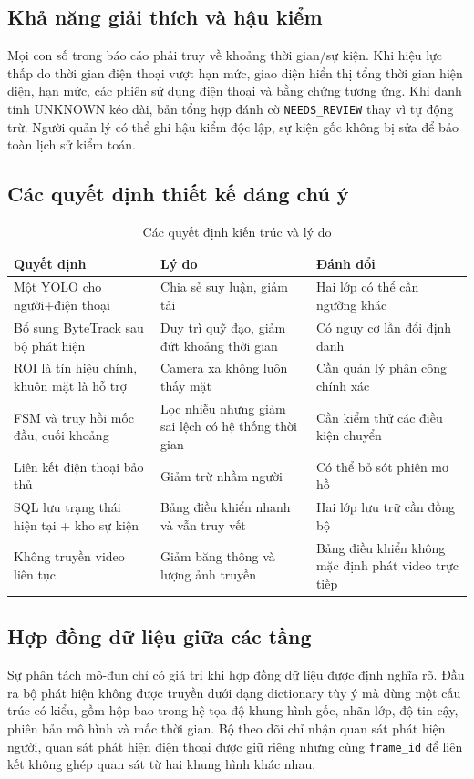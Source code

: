 \subsection{Khả năng giải thích và hậu kiểm}
Mọi con số trong báo cáo phải truy về khoảng thời gian/sự kiện. Khi hiệu lực thấp do thời gian điện thoại vượt hạn mức, giao diện hiển thị tổng thời gian hiện diện, hạn mức, các phiên sử dụng điện thoại và bằng chứng tương ứng. Khi danh tính UNKNOWN kéo dài, bản tổng hợp đánh cờ \texttt{NEEDS\_REVIEW} thay vì tự động trừ. Người quản lý có thể ghi hậu kiểm độc lập, sự kiện gốc không bị sửa để bảo toàn lịch sử kiểm toán.

\subsection{Các quyết định thiết kế đáng chú ý}
\begin{table}[H]
\centering
\caption{Các quyết định kiến trúc và lý do}
\label{tab:design-decisions}
\begin{tabularx}{\textwidth}{p{4.2cm}X X}
\toprule
\textbf{Quyết định} & \textbf{Lý do} & \textbf{Đánh đổi}\\
\midrule
Một YOLO cho người+điện thoại & Chia sẻ suy luận, giảm tải & Hai lớp có thể cần ngưỡng khác\\
Bổ sung ByteTrack sau bộ phát hiện & Duy trì quỹ đạo, giảm đứt khoảng thời gian & Có nguy cơ lần đổi định danh\\
ROI là tín hiệu chính, khuôn mặt là hỗ trợ & Camera xa không luôn thấy mặt & Cần quản lý phân công chính xác\\
FSM và truy hồi mốc đầu, cuối khoảng & Lọc nhiễu nhưng giảm sai lệch có hệ thống thời gian & Cần kiểm thử các điều kiện chuyển\\
Liên kết điện thoại bảo thủ & Giảm trừ nhầm người & Có thể bỏ sót phiên mơ hồ\\
SQL lưu trạng thái hiện tại + kho sự kiện & Bảng điều khiển nhanh và vẫn truy vết & Hai lớp lưu trữ cần đồng bộ\\
Không truyền video liên tục & Giảm băng thông và lượng ảnh truyền & Bảng điều khiển không mặc định phát video trực tiếp\\
\bottomrule
\end{tabularx}
\end{table}

\subsection{Hợp đồng dữ liệu giữa các tầng}
Sự phân tách mô-đun chỉ có giá trị khi hợp đồng dữ liệu được định nghĩa rõ. Đầu ra bộ phát hiện không được truyền dưới dạng dictionary tùy ý mà dùng một cấu trúc có kiểu, gồm hộp bao trong hệ tọa độ khung hình gốc, nhãn lớp, độ tin cậy, phiên bản mô hình và mốc thời gian. Bộ theo dõi chỉ nhận quan sát phát hiện người, quan sát phát hiện điện thoại được giữ riêng nhưng cùng \texttt{frame\_id} để liên kết không ghép quan sát từ hai khung hình khác nhau.

